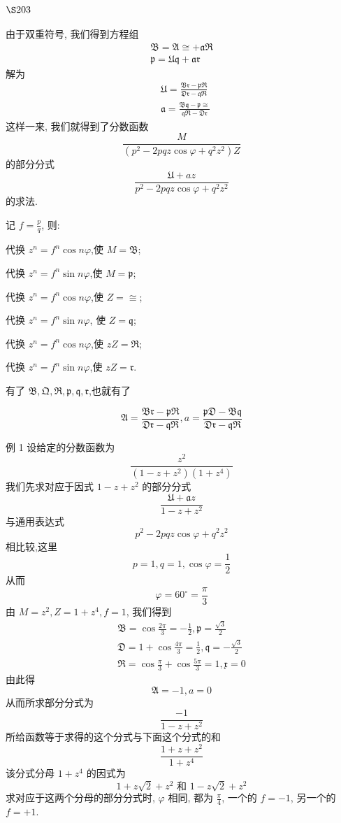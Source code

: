 \section{$\S 203$}

由于双重符号, 我们得到方程组
\[
\begin{gathered}
\mathfrak{B}=\mathfrak{A} \cong+\mathfrak{a} \mathfrak{R} \\
\mathfrak{p}=\mathfrak{U} \mathfrak{q}+\mathfrak{a} \mathfrak{r}
\end{gathered}
\]
解为
\[
\begin{aligned}
& \mathfrak{U}=\frac{\mathfrak{B r}-\mathfrak{p} \mathfrak{R}}{\mathfrak{D r}-\mathfrak{q} \mathfrak{R}} \\
& \mathfrak{a}=\frac{\mathfrak{B} \mathfrak{q}-\mathfrak{p} \cong}{\mathfrak{q} \mathfrak{R}-\mathfrak{D r}}
\end{aligned}
\]
这样一来, 我们就得到了分数函数
\[
\frac{M}{\left(p^{2}-2 p q z \cos \varphi+q^{2} z^{2}\right) Z}
\]
的部分分式
\[
\frac{\mathfrak{U}+a z}{p^{2}-2 p q z \cos \varphi+q^{2} z^{2}}
\]
的求法.

记 $f=\frac{p}{q}$, 则:

代换 $z^{n}=f^{n} \cos n \varphi$,使 $M=\mathfrak{B}$;

代换 $z^{n}=f^{n} \sin n \varphi$,使 $M=\mathfrak{p}$;

代换 $z^{n}=f^{n} \cos n \varphi$,使 $Z=\cong$;

代换 $z^{n}=f^{n} \sin n \varphi$, 使 $Z=\mathfrak{q}$;

代换 $z^{n}=f^{n} \cos n \varphi$,使 $z Z=\Re$;

代换 $z^{n}=f^{n} \sin n \varphi$,使 $z Z=\mathfrak{r}$.

有了 $\mathfrak{B}, \mathfrak{Q}, \mathfrak{R}, \mathfrak{p}, \mathfrak{q}, \mathfrak{r}$,也就有了

\[
\mathfrak{A}=\frac{\mathfrak{Br}-\mathfrak{pR}}{\mathfrak{Dr}-\mathfrak{qR}}, a=\frac{\mathfrak{pD}-\mathfrak{B q}}{\mathfrak{D r}-\mathfrak{qR}}
\]

例 1 设给定的分数函数为
\[
\frac{z^{2}}{\left(1-z+z^{2}\right)\left(1+z^{4}\right)}
\]
我们先求对应于因式 $1-z+z^{2}$ 的部分分式
\[
\frac{\mathfrak{U}+\mathfrak{a} z}{1-z+z^{2}}
\]
与通用表达式
\[
p^{2}-2 p q z \cos \varphi+q^{2} z^{2}
\]
相比较,这里 
\[
p=1, q=1, \cos \varphi=\frac{1}{2}
\]
从而
\[
\varphi=60^{\circ}=\frac{\pi}{3}
\]
由 $M=z^{2}, Z=1+z^{4}, f=1$, 我们得到
\[
\begin{gathered}
\mathfrak{B}=\cos \frac{2 \pi}{3}=-\frac{1}{2}, \mathfrak{p}=\frac{\sqrt{3}}{2} \\
\mathfrak{D}=1+\cos \frac{4 \pi}{3}=\frac{1}{2}, \mathfrak{q}=-\frac{\sqrt{3}}{2} \\
\mathfrak{R}=\cos \frac{\pi}{3}+\cos \frac{5 \pi}{3}=1, \mathfrak{x}=0
\end{gathered}
\]
由此得
\[
\mathfrak{A}=-1, a=0
\]
从而所求部分分式为
\[
\frac{-1}{1-z+z^{2}}
\]
所给函数等于求得的这个分式与下面这个分式的和
\[
\frac{1+z+z^{2}}{1+z^{4}}
\]
该分式分母 $1+z^{4}$ 的因式为
\[
1+z \sqrt{2}+z^{2} \text { 和 } 1-z \sqrt{2}+z^{2}
\]
求对应于这两个分母的部分分式时, $\varphi$ 相同, 都为 $\frac{\pi}{4}$, 一个的 $f=-1$, 另一个的 $f=+1$.

